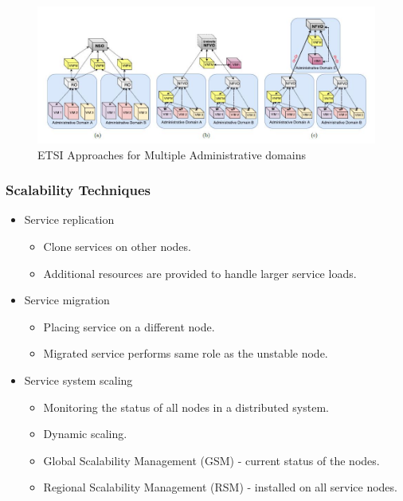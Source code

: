 \begin{frame}
\begin{figure}
	\centering
	\includegraphics[width=1\linewidth]{"images/ETSI approaches"}
	\caption{ETSI Approaches for Multiple Administrative domains \cite{de2018network}}
	\label{fig:etsi-approaches}
\end{figure}

\end{frame}

\begin{frame}
\frametitle{Scalability Techniques}

\begin{itemize}
	
	
	\item Service replication
	\begin{itemize}
		\item Clone services on other nodes.
		\item Additional resources are provided to handle larger service loads.
		
	\end{itemize}
	\item Service migration
	\begin{itemize}
		\item Placing service on a different node.
		\item Migrated service performs same role as the unstable node.
	\end{itemize}
	
\end{itemize}
\end{frame}

\begin{frame}
\begin{itemize}
	\item Service system scaling
	\begin{itemize}
		\item Monitoring the status of all nodes in a distributed system.
		\item Dynamic scaling.
		\item Global Scalability Management (GSM) - current status of the nodes.
		\item Regional Scalability Management (RSM) - installed on all service nodes.
	\end{itemize}
	
\end{itemize}
\end{frame}

